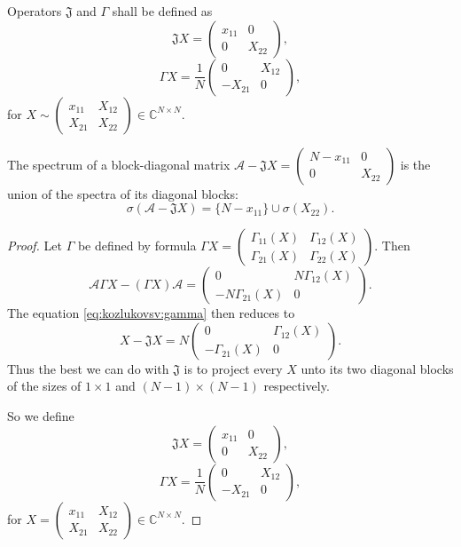\begin{lem}
    Operators \( \mathfrak{J} \) and \( \Gamma \)
    shall be defined as
    \[
        \mathfrak{J} X = \begin{pmatrix} x_{11} & 0 \\ 0 & X_{22} \end{pmatrix}, \]
    \[
        \Gamma X = \frac{1}{N} \begin{pmatrix} 0 & X_{12} \\ -X_{21} & 0 \end{pmatrix}, \]
     for \( X\sim \begin{pmatrix}x_{11} & X_{12} \\ X_{21} & X_{22}\end{pmatrix} \in \mathbb{C}^{N{\times}N} \).

\end{lem}
\begin{crl}
    The spectrum of a block-diagonal matrix
    \( \mathcal{A} - \mathfrak{J}X = \begin{pmatrix} N{-}x_{11} & 0 \\ 0 & X_{22} \end{pmatrix} \)
    is the union of the spectra of its diagonal blocks:
    \[
        \sigma(\mathcal{A} - \mathfrak{J} X) = \{ N - x_{11} \} \cup \sigma(X_{22}). \]
\end{crl}
\begin{proof}
Let \( \Gamma \) be defined by formula
    \( \Gamma X = \begin{pmatrix} \Gamma_{11}(X) & \Gamma_{12}(X) \\
        \Gamma_{21}(X) & \Gamma_{22}(X)
    \end{pmatrix} \).
    Then
\[
    \mathcal{A} \Gamma X - (\Gamma X)\mathcal{A} = 
    \begin{pmatrix} 0 & N\Gamma_{12}(X) \\
        - N\Gamma_{21}(X) & 0
        \end{pmatrix}. \]
The equation \eqref{eq:kozlukovsv:gamma} then reduces to
\[
    X - \mathfrak{J} X =
    N \begin{pmatrix} 0 & \Gamma_{12}(X) \\
        - \Gamma_{21}(X) & 0
        \end{pmatrix}. \]
Thus the best we can do with \( \mathfrak{J} \)
    is to project every \( X \) unto its two diagonal blocks of the sizes
    of \( 1\times 1 \) and \( (N-1)\times(N-1) \) respectively.

So we define
\[
    \mathfrak{J} X = \begin{pmatrix} x_{11} & 0 \\ 0 & X_{22} \end{pmatrix}, \]
\[
    \Gamma X = \frac{1}{N}\begin{pmatrix} 0 & X_{12} \\ -X_{21} & 0 \end{pmatrix}, \]
for \( X =
    \begin{pmatrix}
    x_{11} & X_{12} \\
    X_{21} & X_{22}
    \end{pmatrix} \in \mathbb{C}^{N{\times}N} \).
\end{proof}

